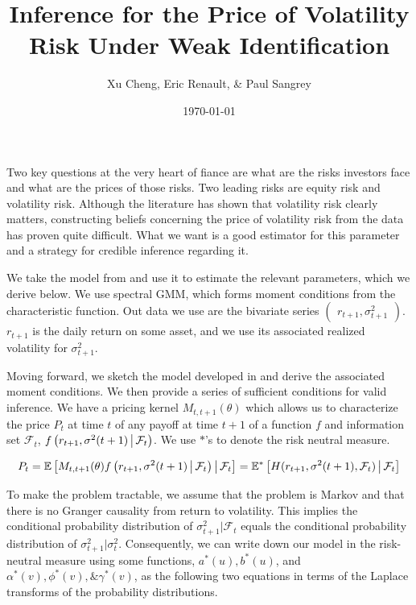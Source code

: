 \documentclass[11pt]{article}
\author{Xu Cheng, Eric Renault, \& Paul Sangrey}
\title{Inference for the Price of Volatility Risk Under Weak Identification}
\date{\today}
\newcommand*{\F}{\mathcal{F}}
\newcommand*{\E}{\mathbb{E}}
\newcommand{\mvert}[1][\middle]{\ensuremath{\,#1\vert\,}}
\begin{document}
\maketitle

Two key questions at the very heart of fiance are what are the risks investors face and what are the prices of
those risks.
Two leading risks are equity risk and volatility risk.
Although the literature has shown that volatility risk clearly matters, constructing beliefs concerning the price
of volatility risk from the data has proven quite difficult.
What we want is a good estimator for this parameter and a strategy for credible inference regarding it.  

We take the model from \textcite{khrapov2016affine} and use it to estimate the relevant
parameters, which we derive below. 
We use spectral GMM, which forms moment conditions from the characteristic function.
Out data we use are the bivariate series $\begin{pmatrix} r_{t+1}, \sigma^2_{t+1} \end{pmatrix}$.
$r_{t+1}$ is the daily return on some asset, and we use its associated realized volatility for $\sigma^2_{t+1}$.

Moving forward, we sketch the model developed in \textcite{khrapov2016affine} and derive the associated moment
conditions.
We then provide a series of sufficient conditions for valid inference. 
We have a pricing kernel $M_{t, t+1}(\theta)$ which allows us to characterize the price $P_t$ at time $t$ of any
payoff at time $t+1$ of a function $f$ and information set $\F_t$, $f\left(r_{t+1}, \sigma^2(t+1) \mvert
\F_t\right)$. 
We use $*$'s to denote the risk neutral measure.

\begin{equation}
    P_t  = \E\left[M_{t,t+1}(\theta) f\left(r_{t+1}, \sigma^2(t+1) \mvert  \F_t\right) \mvert \F_t \right] =
    \E^{*}\left[H(r_{t+1}, \sigma^2(t+1),  \F_t) \mvert \F_t \right] 
\end{equation}


To make the problem tractable, we assume that the problem is Markov and that there is no Granger causality from
return to volatility. 
This implies the conditional probability distribution of $\sigma^2_{t+1} \vert \F_t$ equals the conditional
probability distribution of $\sigma^2_{t+1} \vert \sigma^2_t$.
Consequently, we can write down our model in the risk-neutral measure using some functions, $a^{*}(u), b^{*}(u)$,
and $\alpha^{*}(v), \phi^{*}(v), \& \gamma^{*}(v)$, as the following two equations in terms of the Laplace
transforms of the probability distributions.
\end{document}

